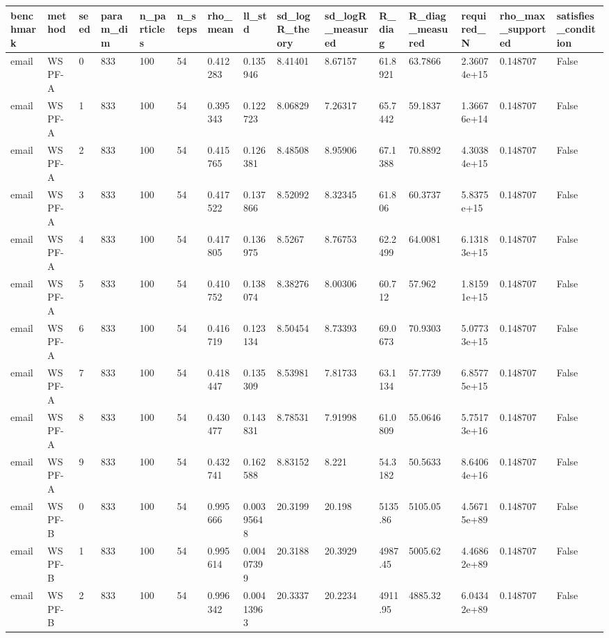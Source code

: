 \begin{tabular}{lllllllllllllll}
\hline
benchmark & method & seed & param\_dim & n\_particles & n\_steps & rho\_mean & ll\_std & sd\_logR\_theory & sd\_logR\_measured & R\_diag & R\_diag\_measured & required\_N & rho\_max\_supported & satisfies\_condition \\
\hline
email & WSPF-A & 0 & 833 & 100 & 54 & 0.412283 & 0.135946 & 8.41401 & 8.67157 & 61.8921 & 63.7866 & 2.36074e+15 & 0.148707 & False \\
email & WSPF-A & 1 & 833 & 100 & 54 & 0.395343 & 0.122723 & 8.06829 & 7.26317 & 65.7442 & 59.1837 & 1.36676e+14 & 0.148707 & False \\
email & WSPF-A & 2 & 833 & 100 & 54 & 0.415765 & 0.126381 & 8.48508 & 8.95906 & 67.1388 & 70.8892 & 4.30384e+15 & 0.148707 & False \\
email & WSPF-A & 3 & 833 & 100 & 54 & 0.417522 & 0.137866 & 8.52092 & 8.32345 & 61.806 & 60.3737 & 5.8375e+15 & 0.148707 & False \\
email & WSPF-A & 4 & 833 & 100 & 54 & 0.417805 & 0.136975 & 8.5267 & 8.76753 & 62.2499 & 64.0081 & 6.13183e+15 & 0.148707 & False \\
email & WSPF-A & 5 & 833 & 100 & 54 & 0.410752 & 0.138074 & 8.38276 & 8.00306 & 60.712 & 57.962 & 1.81591e+15 & 0.148707 & False \\
email & WSPF-A & 6 & 833 & 100 & 54 & 0.416719 & 0.123134 & 8.50454 & 8.73393 & 69.0673 & 70.9303 & 5.07733e+15 & 0.148707 & False \\
email & WSPF-A & 7 & 833 & 100 & 54 & 0.418447 & 0.135309 & 8.53981 & 7.81733 & 63.1134 & 57.7739 & 6.85775e+15 & 0.148707 & False \\
email & WSPF-A & 8 & 833 & 100 & 54 & 0.430477 & 0.143831 & 8.78531 & 7.91998 & 61.0809 & 55.0646 & 5.75173e+16 & 0.148707 & False \\
email & WSPF-A & 9 & 833 & 100 & 54 & 0.432741 & 0.162588 & 8.83152 & 8.221 & 54.3182 & 50.5633 & 8.64064e+16 & 0.148707 & False \\
email & WSPF-B & 0 & 833 & 100 & 54 & 0.995666 & 0.00395648 & 20.3199 & 20.198 & 5135.86 & 5105.05 & 4.56715e+89 & 0.148707 & False \\
email & WSPF-B & 1 & 833 & 100 & 54 & 0.995614 & 0.00407399 & 20.3188 & 20.3929 & 4987.45 & 5005.62 & 4.46862e+89 & 0.148707 & False \\
email & WSPF-B & 2 & 833 & 100 & 54 & 0.996342 & 0.00413963 & 20.3337 & 20.2234 & 4911.95 & 4885.32 & 6.04342e+89 & 0.148707 & False \\

\end{tabular}
